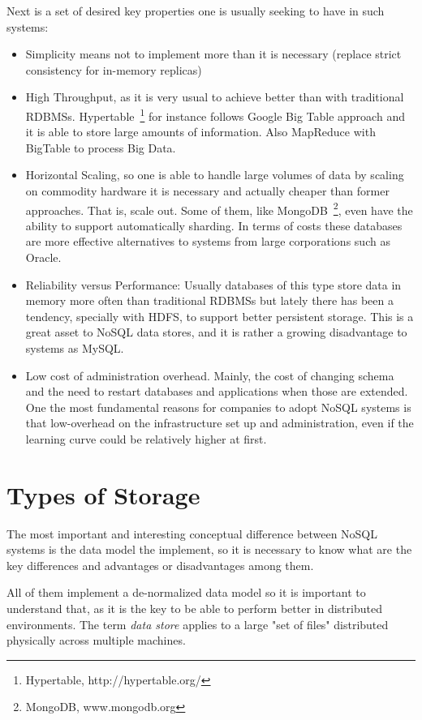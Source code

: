 Next is a set of desired key properties one is usually seeking to have in such systems:
\begin{itemize}
	\item Simplicity means not to implement more than it is necessary (replace strict consistency for in-memory replicas)
	\item High Throughput, as it is very usual to achieve better than with traditional RDBMSs. Hypertable~\footnote{Hypertable, http://hypertable.org/} for instance follows Google Big Table\cite{Chang:2006} approach and it is able to store large amounts of information. Also MapReduce with BigTable to process Big Data.
	\item Horizontal Scaling, so one is able to handle large volumes of data by scaling on commodity hardware it is necessary and actually cheaper than former approaches. That is, scale out. Some of them, like MongoDB~\footnote{MongoDB, www.mongodb.org}, even have the ability to support automatically sharding. In terms of costs these databases are more effective alternatives to systems from large corporations such as Oracle.
	\item Reliability versus Performance: Usually databases of this type store data in memory more often than traditional RDBMSs but lately there has been a tendency, specially with HDFS, to support better persistent storage. This is a great asset to NoSQL data stores, and it is rather a growing disadvantage to systems as MySQL.
	\item Low cost of administration overhead. Mainly, the cost of changing schema and the need to restart databases and applications when those are extended. One the most fundamental reasons for companies to adopt NoSQL systems is that low-overhead on the infrastructure set up and administration, even if the learning curve could be relatively higher at first.
\end{itemize}

\section{Types of Storage} %
The most important and interesting conceptual difference between NoSQL systems is the data model the implement, so it is necessary to know what are the key differences and advantages or disadvantages among them.

All of them implement a de-normalized data model so it is important to understand that, as it is the key to be able to perform better in distributed environments. The term \emph{data store} applies to a large "set of files" distributed physically across multiple machines.

